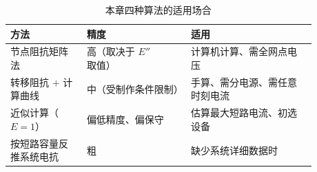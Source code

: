\begin{table}[htbp]
  \centering
  \caption{本章四种算法的适用场合}
  \small
  \begin{tabular}{@{}p{0.22\linewidth}p{0.30\linewidth}p{0.36\linewidth}@{}}
    \toprule
    方法 & 精度 & 适用 \\
    \midrule
    节点阻抗矩阵法 & 高（取决于 $E''$ 取值） & 计算机计算、需全网点电压 \\
    转移阻抗 $+$ 计算曲线 & 中（受制作条件限制） & 手算、需分电源、需任意时刻电流 \\
    近似计算（$E=1$） & 偏低精度、偏保守 & 估算最大短路电流、初选设备 \\
    按短路容量反推系统电抗 & 粗 & 缺少系统详细数据时 \\
    \bottomrule
  \end{tabular}
\end{table}

